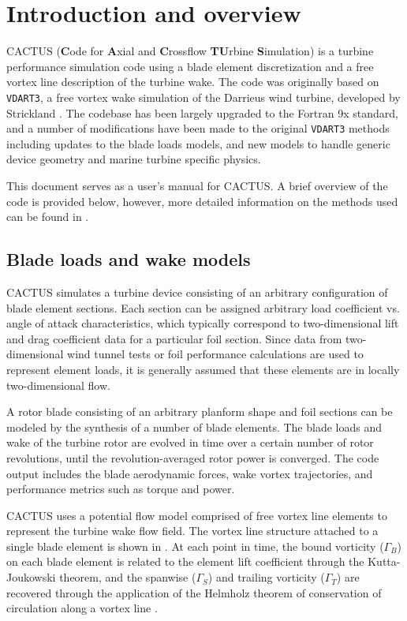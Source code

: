 \chapter{Introduction and overview}
CACTUS (\textbf{C}ode for \textbf{A}xial and \textbf{C}rossflow \textbf{TU}rbine \textbf{S}imulation) is a turbine performance simulation code using a blade element discretization and a free vortex line description of the turbine wake. The code was originally based on \texttt{VDART3}, a free vortex wake simulation of the Darrieus wind turbine, developed by Strickland \cite{Strickland1979}. The codebase has been largely upgraded to the Fortran 9x standard, and a number of modifications have been made to the original \texttt{VDART3} methods including updates to the blade loads models, and new models to handle generic device geometry and marine turbine specific physics.

This document serves as a user's manual for CACTUS. A brief overview of the code is provided below, however, more detailed information on the methods used can be found in \cite{Murray2011}. 

\section{Blade loads and wake models}
CACTUS simulates a turbine device consisting of an arbitrary configuration of blade element sections. Each section can be assigned arbitrary load coefficient vs. angle of attack characteristics, which typically correspond to two-dimensional lift and drag coefficient data for a particular foil section. Since data from two-dimensional wind tunnel tests or foil performance calculations are used to represent element loads, it is generally assumed that these elements are in locally two-dimensional flow. 

A rotor blade consisting of an arbitrary planform shape and foil sections can be modeled by the synthesis of a number of blade elements. The blade loads and wake of the turbine rotor are evolved in time over a certain number of rotor revolutions, until the revolution-averaged rotor power is converged.  The code output includes the blade aerodynamic forces, wake vortex trajectories, and performance metrics such as torque and power.  

CACTUS uses a potential flow model comprised of free vortex line elements to represent the turbine wake flow field. The vortex line structure attached to a single blade element is shown in . At each point in time, the bound vorticity ($\Gamma_B$) on each blade element is related to the element lift coefficient through the Kutta-Joukowski theorem, and the spanwise ($\Gamma_S$) and trailing vorticity ($\Gamma_T$) are recovered through the application of the Helmholz theorem of conservation of circulation along a vortex line \cite{katz2001low}.

